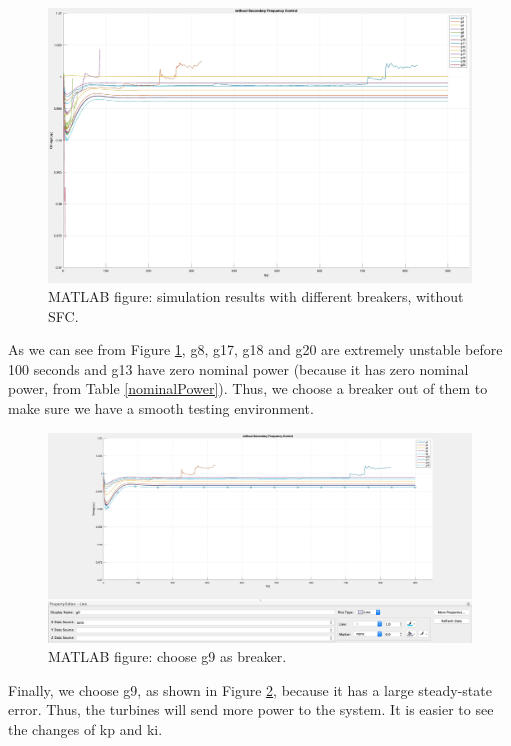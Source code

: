 \documentclass{report}
\begin{document}
\begin{figure}[htbp]
\centering
\includegraphics[width = .891\textwidth]{figure/4_1_1_without1.jpeg}
\caption{MATLAB figure: simulation results with different breakers, without SFC.}
\label{4_1_1_without1}
\end{figure}

As we can see from Figure \textcolor{red}{\ref{4_1_1_without1}}, g8, g17, g18 and g20 are extremely unstable before 100 seconds and g13 have zero nominal power (because it has zero nominal power, from Table \textcolor{red}{\ref{nominalPower}}). Thus, we choose a breaker out of them to make sure we have a smooth testing environment.\\


\begin{figure}[htbp]
\centering
\includegraphics[width = .891\textwidth]{figure/4_1_1_without2.jpeg}
\caption{MATLAB figure: choose g9 as breaker.}
\label{4_1_1_without2}
\end{figure}

Finally, we choose g9, as shown in Figure \textcolor{red}{\ref{4_1_1_without2}}, because it has a large steady-state error. Thus, the turbines will send more power to the system. It is easier to see the changes of kp and ki.\\
\end{document}
